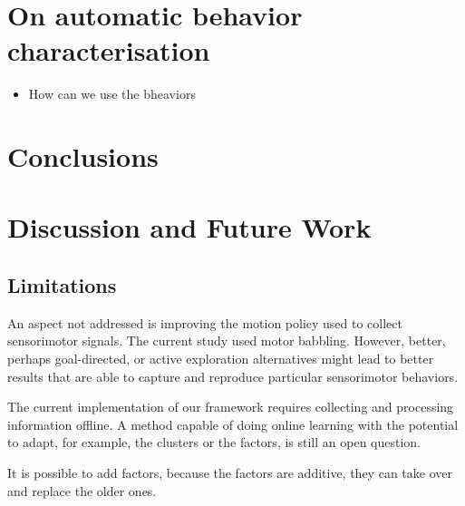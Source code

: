 \section{On automatic behavior characterisation}
\begin{itemize}
    \item How can we use the bheaviors 
\end{itemize}

\section{Conclusions}\label{sec:conclusion}

\section{Discussion and Future Work}

\subsection{Limitations}
An aspect not addressed is improving the motion policy used to collect sensorimotor signals. The current study used motor babbling. However, better, perhaps goal-directed, or active exploration alternatives might lead to better results that are able to capture and reproduce particular sensorimotor behaviors.

The current implementation of our framework requires collecting and processing information offline. A method capable of doing online learning with the potential to adapt, for example, the clusters or the factors, is still an open question.

It is possible to add factors, because the factors are additive, they can take over and replace the older ones.

\printbibliography 
